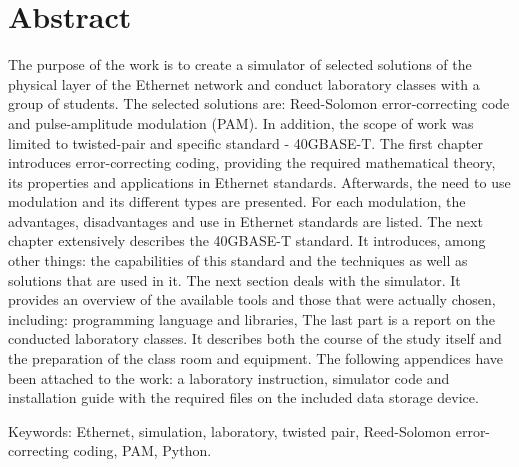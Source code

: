 \section*{Abstract}

The purpose of the work is to create a simulator of selected solutions of the physical layer of the Ethernet network and conduct laboratory classes with a group of students. The selected solutions are: Reed-Solomon error-correcting code and pulse-amplitude modulation (PAM). In addition, the scope of work was limited to twisted-pair and specific standard - 40GBASE-T. The first chapter introduces error-correcting coding, providing the required mathematical theory, its properties and applications in Ethernet standards. Afterwards, the need to use modulation and its different types are presented. For each modulation, the advantages, disadvantages and use in Ethernet standards are listed. The next chapter extensively describes the 40GBASE-T standard. It introduces, among other things: the capabilities of this standard and the techniques as well as solutions that are used in it. The next section deals with the simulator. It provides an overview of the available tools and those that were actually chosen, including: programming language and libraries, The last part is a report on the conducted laboratory classes. It describes both the course of the study itself and the preparation of the class room and equipment. The following appendices have been attached to the work: a laboratory instruction, simulator code and installation guide with the required files on the included data storage device.

Keywords: Ethernet, simulation, laboratory, twisted pair, Reed-Solomon error-correcting coding, PAM, Python.